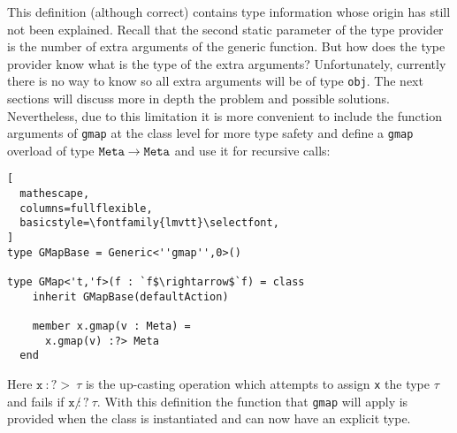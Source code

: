 \documentclass{sigplanconf}
\begin{document}
This definition (although correct) contains type information whose
origin has still not been explained. Recall that the second static
parameter of the type provider is the number of extra arguments of the
generic function. But how does the type provider know what is the type
of the extra arguments? Unfortunately, currently there is no way to
know so all extra arguments will be of type \verb+obj+. The next
sections will discuss more in depth the problem and possible
solutions. Nevertheless, due to this limitation it is more convenient
to include the function arguments of \verb+gmap+ at the class level
for more type safety and define a \verb+gmap+ overload of type
$\mathtt{Meta}\rightarrow\mathtt{Meta}$ and use it for recursive calls:
\begin{lstlisting}[
  mathescape,
  columns=fullflexible,
  basicstyle=\fontfamily{lmvtt}\selectfont,
]
type GMapBase = Generic<''gmap'',0>()

type GMap<'t,'f>(f : `f$\rightarrow$`f) = class
    inherit GMapBase(defaultAction)

    member x.gmap(v : Meta) =
      x.gmap(v) :?> Meta
  end
\end{lstlisting}
Here $\mathtt{x}\ :?>\ \tau$ is the up-casting operation which
attempts to assign \verb+x+ the type $\tau$ and fails if $\mathtt{x}\
\not:?\ \tau$. With this definition the function that \verb+gmap+ will
apply is provided when the class is instantiated and can now have an
explicit type.
\end{document}
